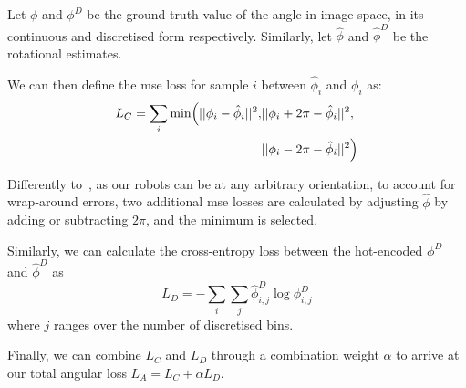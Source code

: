 \documentclass[conference]{ieeeconf}
\begin{document}

Let $\phi$ and $\phi^D$ be the ground-truth value of the angle in image space, in its continuous and discretised form respectively.
Similarly, let $\hat{\phi}$ and $\hat{\phi}^D$ be the rotational estimates.

We can then define the \gls{mse} loss for sample $i$ between $\hat{\phi}_i$ and $\phi_i$ as:
\begin{equation}\label{eqn:LC}
\begin{split}
L_C = \sum_{i} \min \Bigl( ||\phi_i - \hat{\phi}_i||^2, & ||\phi_i + 2\pi - \hat{\phi}_i||^2, \\
&  ||\phi_i - 2\pi - \hat{\phi}_i||^2 \Bigr)
\end{split}
\end{equation}

Differently to~\cite{ruiz2018fine}, as our robots can be at any arbitrary orientation, to account for wrap-around errors, two additional \gls{mse} losses are calculated by adjusting $\hat\phi$ by adding or subtracting $2\pi$, and the minimum is selected.

Similarly, we can calculate the cross-entropy loss between the hot-encoded $\phi^D$ and $\hat{\phi}^D$ as
\begin{equation}
L_D = - \sum_{i} \sum_{j} \hat{\phi}^D_{i, j} \log \phi^D_{i, j}
\end{equation}
where $j$ ranges over the number of discretised bins.

Finally, we can combine $L_C$ and $L_D$ through a combination weight $\alpha$ to arrive at our total angular loss $L_A = L_C + \alpha L_D$.


\end{document}
